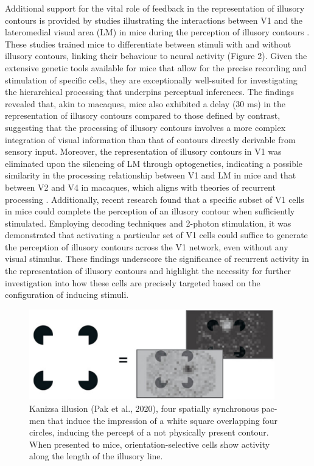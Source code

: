 \documentclass[12pt]{article}
\begin{document}
\noindent Additional support for the vital role of feedback in the representation of illusory contours is provided by studies illustrating the interactions between V1 and the lateromedial visual area (LM) in mice during the perception of illusory contours \autocite{pakTopDownFeedbackControls2020}. These studies trained mice to differentiate between stimuli with and without illusory contours, linking their behaviour to neural activity (Figure 2). Given the extensive genetic tools available for mice that allow for the precise recording and stimulation of specific cells, they are exceptionally well-suited for investigating the hierarchical processing that underpins perceptual inferences. The findings revealed that, akin to macaques, mice also exhibited a delay (30 ms) in the representation of illusory contours compared to those defined by contrast, suggesting that the processing of illusory contours involves a more complex integration of visual information than that of contours directly derivable from sensory input. Moreover, the representation of illusory contours in V1 was eliminated upon the silencing of LM through optogenetics, indicating a possible similarity in the processing relationship between V1 and LM in mice and that between V2 and V4 in macaques, which aligns with theories of recurrent processing \autocite{wyatteEarlyRecurrentFeedback2014}. Additionally, recent research \cite{shinRecurrentPatternCompletion2023} found that a specific subset of V1 cells in mice could complete the perception of an illusory contour when sufficiently stimulated. Employing decoding techniques and 2-photon stimulation, it was demonstrated that activating a particular set of V1 cells could suffice to generate the perception of illusory contours across the V1 network, even without any visual stimulus. These findings underscore the significance of recurrent activity in the representation of illusory contours and highlight the necessity for further investigation into how these cells are precisely targeted based on the configuration of inducing stimuli.

\begin{figure}[H]
    \centering
    \includegraphics[width=0.95\textwidth]{figures/Kanizsa_Mice.png}
    \caption{Kanizsa illusion (Pak et al., 2020), four spatially synchronous pac-men that induce the impression of a white square overlapping four circles, inducing the percept of a not physically present contour. When presented to mice, orientation-selective cells show activity along the length of the illusory line.}
    \label{fig:simple_abutting}
\end{figure}
\end{document}
